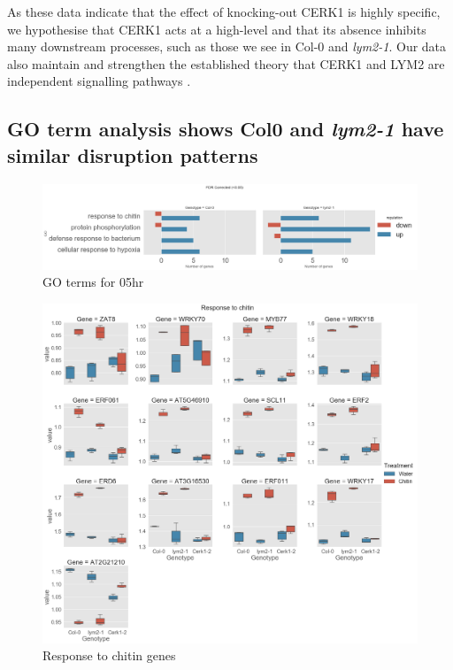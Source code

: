 \documentclass[../main.tex]{subfiles}
\begin{document}
As these data indicate that the effect of knocking-out CERK1 is highly specific,
we hypothesise that CERK1 acts at a high-level and that its absence
inhibits many downstream processes, such as those we see in Col-0 and \textit{lym2-1}.
Our data also maintain and strengthen the established theory that CERK1 and LYM2 are
independent signalling pathways \cite{Faulkner2013, miyaCERK1LysMReceptor2007,
  narusakaPresenceLYM2Dependent2013}.



\subsection{GO term analysis shows Col0 and \textit{lym2-1} have similar
  disruption patterns}


\begin{figure}[ht]
  \centering
  \includegraphics[width=\columnwidth]{figures/05hrGO.png}
  \caption{\label{fig:05hrGO} GO terms for 05hr}
\end{figure}



\begin{figure}[ht]
  \centering
  \includegraphics[width=\textwidth, height=\textheight, keepaspectratio]{figures/response to chitin.png}
  \caption{\label{fig:respchitin} Response to chitin genes}
\end{figure}
\end{document}
